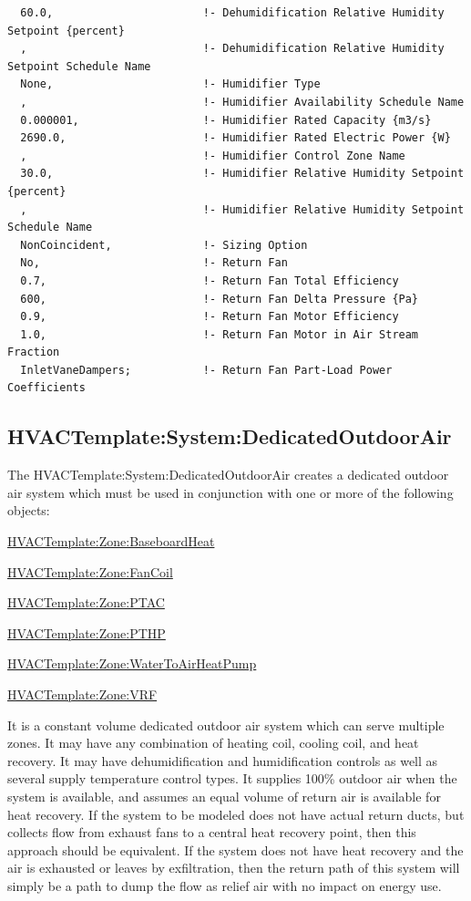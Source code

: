 \begin{lstlisting}
  60.0,                       !- Dehumidification Relative Humidity Setpoint {percent}
  ,                           !- Dehumidification Relative Humidity Setpoint Schedule Name
  None,                       !- Humidifier Type
  ,                           !- Humidifier Availability Schedule Name
  0.000001,                   !- Humidifier Rated Capacity {m3/s}
  2690.0,                     !- Humidifier Rated Electric Power {W}
  ,                           !- Humidifier Control Zone Name
  30.0,                       !- Humidifier Relative Humidity Setpoint {percent}
  ,                           !- Humidifier Relative Humidity Setpoint Schedule Name
  NonCoincident,              !- Sizing Option
  No,                         !- Return Fan
  0.7,                        !- Return Fan Total Efficiency
  600,                        !- Return Fan Delta Pressure {Pa}
  0.9,                        !- Return Fan Motor Efficiency
  1.0,                        !- Return Fan Motor in Air Stream Fraction
  InletVaneDampers;           !- Return Fan Part-Load Power Coefficients
\end{lstlisting}

\subsection{HVACTemplate:System:DedicatedOutdoorAir}\label{hvactemplatesystemdedicatedoutdoorair}

The HVACTemplate:System:DedicatedOutdoorAir creates a dedicated outdoor air system which must be used in conjunction with one or more of the following objects:

\hyperref[hvactemplatezonebaseboardheat]{HVACTemplate:Zone:BaseboardHeat}

\hyperref[hvactemplatezonefancoil]{HVACTemplate:Zone:FanCoil}

\hyperref[hvactemplatezoneptac]{HVACTemplate:Zone:PTAC}

\hyperref[hvactemplatezonepthp]{HVACTemplate:Zone:PTHP}

\hyperref[hvactemplatezonewatertoairheatpump]{HVACTemplate:Zone:WaterToAirHeatPump}

\hyperref[hvactemplatezonevrf]{HVACTemplate:Zone:VRF}

It is a constant volume dedicated outdoor air system which can serve multiple zones. It may have any combination of heating coil, cooling coil, and heat recovery. It may have dehumidification and humidification controls as well as several supply temperature control types. It supplies 100\% outdoor air when the system is available, and assumes an equal volume of return air is available for heat recovery. If the system to be modeled does not have actual return ducts, but collects flow from exhaust fans to a central heat recovery point, then this approach should be equivalent. If the system does not have heat recovery and the air is exhausted or leaves by exfiltration, then the return path of this system will simply be a path to dump the flow as relief air with no impact on energy use.

